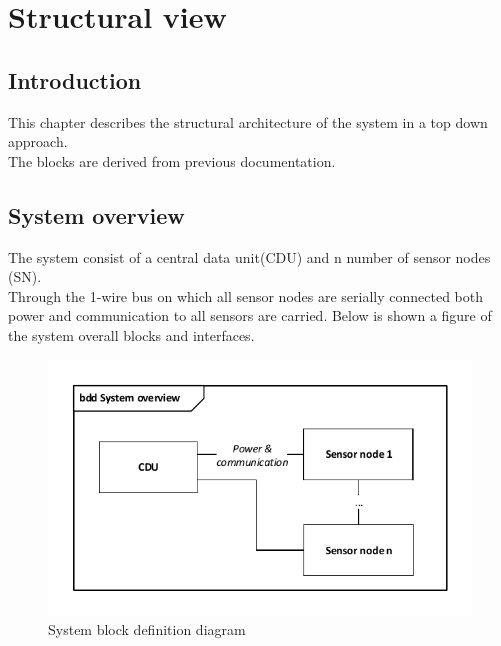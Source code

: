 \chapter{Structural view}

\section{Introduction}
This chapter describes the structural architecture of the system in a top down approach.\\
The blocks are derived from previous documentation.


\section{System overview}
The system consist of a central data unit(CDU) and n number of sensor nodes (SN).\\
Through the 1-wire bus on which all sensor nodes are serially connected both power and communication to all sensors are carried. Below is shown a figure of the system overall blocks and interfaces.
\begin{figure}[hbpt]
\centering
\includegraphics[width=.9\textwidth]{billeder/systembdd}
\caption{System block definition diagram}
\label{systembdd}
\end{figure}

